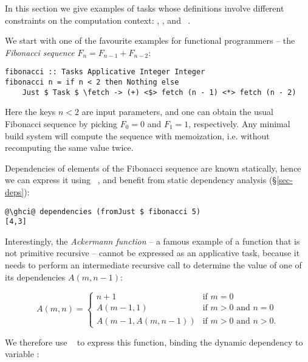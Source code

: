 In this section we give examples of tasks whose definitions involve different
constraints on the computation context: , ,
 and ~.

We start with one of the favourite examples for functional
programmers -- the \emph{Fibonacci sequence} $F_n = F_{n-1} + F_{n-2}$:

\vspace{1mm}
\begin{verbatim}
fibonacci :: Tasks Applicative Integer Integer
fibonacci n = if n < 2 then Nothing else
    Just $ Task $ \fetch -> (+) <$> fetch (n - 1) <*> fetch (n - 2)
\end{verbatim}
\vspace{1mm}

\noindent
Here the keys $n < 2$ are input parameters, and one can obtain the usual
Fibonacci sequence by picking $F_0=0$ and $F_1=1$, respectively. Any minimal
build system will compute the sequence with memoization, i.e. without
recomputing the same value twice.

Dependencies of elements of the Fibonacci sequence are known statically, hence
we can express it using ~, and benefit from static
dependency analysis (\S\ref{sec-deps}):

\vspace{1mm}
\begin{verbatim}
@\ghci@ dependencies (fromJust $ fibonacci 5)
[4,3]
\end{verbatim}
\vspace{1mm}

\noindent
Interestingly, the \emph{Ackermann function} -- a famous example of a function
that is not primitive recursive -- cannot be expressed as an applicative task,
because it needs to perform an intermediate recursive call to determine the
value of one of its dependencies $A(m, n-1)$:

\[
A(m, n) = \left\{
\begin{array}{ll}
n+1 & \mbox{if } m = 0 \\
A(m-1, 1) & \mbox{if } m > 0 \mbox{ and } n = 0 \\
A(m-1, A(m, n-1)) & \mbox{if } m > 0 \mbox{ and } n > 0.
\end{array}\right.
\]

We therefore use ~ to express this function, binding the
dynamic dependency to variable :

